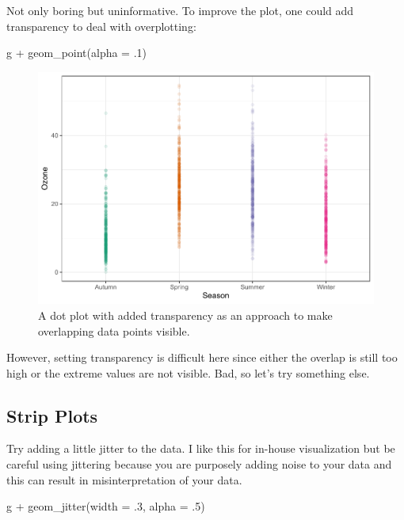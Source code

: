 \documentclass[
]{krantz}
\makeatletter
\newenvironment{Shaded}{\begin{snugshade}}{\end{snugshade}}
\newcommand{\AttributeTok}[1]{\textcolor[rgb]{0.61,0.61,0.61}{#1}}
\newcommand{\DecValTok}[1]{\textcolor[rgb]{0.06,0.06,0.06}{#1}}
\newcommand{\FunctionTok}[1]{\textcolor[rgb]{0,0,0}{#1}}
\newcommand{\NormalTok}[1]{#1}
\newcommand{\SpecialCharTok}[1]{\textcolor[rgb]{0,0,0}{#1}}
\newenvironment{kframe}{%
\medskip{}
\setlength{\fboxsep}{.8em}
 \def\at@end@of@kframe{}%
 \ifinner\ifhmode%
  \def\at@end@of@kframe{\end{minipage}}%
  \begin{minipage}{\columnwidth}%
 \fi\fi%
 \def\FrameCommand##1{\hskip\@totalleftmargin \hskip-\fboxsep
 \colorbox{shadecolor}{##1}\hskip-\fboxsep
     \hskip-\linewidth \hskip-\@totalleftmargin \hskip\columnwidth}%
 \MakeFramed {\advance\hsize-\width
   \@totalleftmargin\z@ \linewidth\hsize
   \@setminipage}}%
 {\par\unskip\endMakeFramed%
 \at@end@of@kframe}
\renewenvironment{Shaded}{\begin{kframe}}{\end{kframe}}
\makeatother
\begin{document}
Not only boring but uninformative. To improve the plot, one could add transparency to deal with overplotting:

\begin{Shaded}
\begin{Highlighting}[]
\NormalTok{g }\SpecialCharTok{+} \FunctionTok{geom\_point}\NormalTok{(}\AttributeTok{alpha =}\NormalTok{ .}\DecValTok{1}\NormalTok{)}
\end{Highlighting}
\end{Shaded}

\begin{figure}
\centering
\includegraphics{bookdown_files/figure-latex/point-alpha-1.pdf}
\caption{\label{fig:point-alpha}A dot plot with added transparency as an approach to make overlapping data points visible.}
\end{figure}

However, setting transparency is difficult here since either the overlap is still too high or the extreme values are not visible. Bad, so let's try something else.

\hypertarget{strip-plots}{%
\subsection{Strip Plots}\label{strip-plots}}

Try adding a little jitter to the data. I like this for in-house visualization but be careful using jittering because you are purposely adding noise to your data and this can result in misinterpretation of your data.

\begin{Shaded}
\begin{Highlighting}[]
\NormalTok{g }\SpecialCharTok{+} \FunctionTok{geom\_jitter}\NormalTok{(}\AttributeTok{width =}\NormalTok{ .}\DecValTok{3}\NormalTok{, }\AttributeTok{alpha =}\NormalTok{ .}\DecValTok{5}\NormalTok{)}
\end{Highlighting}
\end{Shaded}
\end{document}
